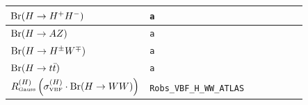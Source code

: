 \documentclass[aps,superscriptaddress,nofootinbib,floatfix,notitlepage]{revtex4-1}
\begin{document}
\begin{table}
\begin{tabular}{|l|l|c|c|c|c|c|}
    \hline
	${\rm Br}(H\to H^+H^-)$ & \tt{a} & & \checkmark & & &\\
    \hline
	${\rm Br}(H\to AZ)$ & \tt{a} & & \checkmark & & &\\
    \hline
	${\rm Br}(H\to H^\pm W^\mp)$ & \tt{a} & & \checkmark & & &\\
    \hline
	${\rm Br}(H\to t\bar{t})$ & \tt{a} & & \checkmark & & &\\
    \hline
	$R^{(H)}_\text{\tiny Gauss} \left( \sigma ^{(H)}_{\text{\tiny{VBF}}} \cdot {\rm Br}(H\to WW)\right) $ & \tt{Robs\_VBF\_H\_WW\_ATLAS} & & \checkmark & & &\\

\end{tabular}
\end{table}
\end{document}
